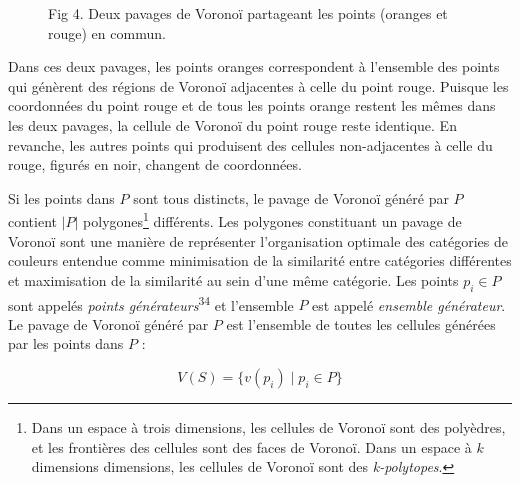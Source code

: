 \documentclass{article}
\begin{document}
\begin{figure}[htbp]
{%
}

\caption{Fig 4. Deux pavages de Voronoï partageant les points (oranges et rouge) en commun.}

\end{figure}

Dans ces deux pavages, les points oranges correspondent à l'ensemble des points qui génèrent des régions de Voronoï adjacentes à celle du point rouge. Puisque les coordonnées du point rouge et de tous les points orange restent les mêmes dans les deux pavages, la cellule de Voronoï du point rouge reste identique. En revanche, les autres points qui produisent des cellules non-adjacentes à celle du rouge, figurés en noir, changent de coordonnées.
\vspace*{1cm}
\par
Si les points dans $P$ sont tous distincts, le pavage de Vorono\"{i} généré par $P$ contient $|P|$
polygones\footnote{Dans un espace à trois dimensions, les cellules de Voronoï sont des polyèdres, et les frontières des cellules
sont des faces de Voronoï. Dans un espace à $k$ dimensions dimensions, les cellules de Voronoï sont des \textit{k-polytopes}.} différents. Les polygones constituant un pavage de Vorono\"{i} sont une manière de
représenter l'organisation optimale des catégories de couleurs entendue comme minimisation
de la similarité entre catégories différentes et maximisation de la similarité au sein d'une même
catégorie. Les points $p_i \in P$ sont appelés \textit{points générateurs}\textsuperscript{34} et l'ensemble $P$ est appelé
\textit{ensemble générateur}. Le pavage de Vorono\"{i} généré par $P$ est l'ensemble de toutes les cellules
générées par les points dans $P$ :

\[
V(S) = \{v(p_i) \mid p_i \in P\}
\]
\end{document}
